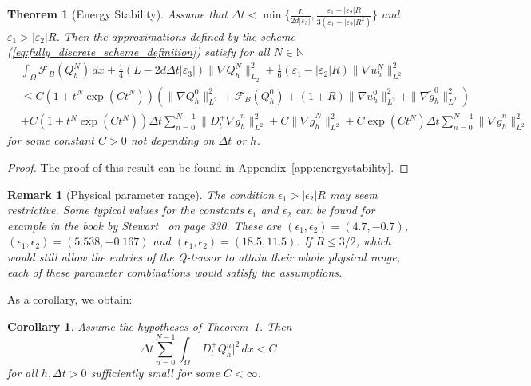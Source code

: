 \documentclass[10pt,letterpaper]{amsart}
\newtheorem{corollary}[lemma]{Corollary}
\newtheorem{theorem}[lemma]{Theorem}
\newtheorem{remark}[lemma]{Remark}
\theoremstyle{definition}{\newtheorem{definition}[lemma]{Definition}}
\theoremstyle{note}{\newtheorem{claim}{Claim}[section]
\newtheorem*{claim*}{Claim}}
\numberwithin{equation}{section}
\begin{document}
\begin{theorem}[Energy Stability]
	\label{thm:fully_discrete_energy_stability}
	Assume that $\Delta t < \min\{\frac{L}{2d|\varepsilon_3|}, \frac{\varepsilon_1 - |\varepsilon_2|R}{3(\varepsilon_1 + |\varepsilon_2|R^2)}\}$ and $\varepsilon_1 > |\varepsilon_2|R$. Then the approximations defined by the scheme (\ref{eq:fully_discrete_scheme_definition}) satisfy for all $N\in\mathbb{N}$
	\begin{align*}
	&\int_\Omega \mathcal{F}_B(Q_h^N)\, dx + \frac14\left(L - 2d\Delta t |\varepsilon_3|\right)\|\nabla Q_h^N\|_{L_2}^2 + \frac{1}{6}\left(\varepsilon_1 - |\varepsilon_2|R\right)\|\nabla u_h^N\|_{L^2}^2\\
	&\le C(1+t^N\operatorname{exp}(Ct^N))\left( \|\nabla Q_h^0\|_{L^2}^2 + \mathcal{F}_B(Q_h^0) + (1+R)\|\nabla u_h^0\|_{L^2}^2 + \|\nabla \tilde g_h^0\|_{L^2}^2\right)\\ 
	&+ C(1 + t^N\operatorname{exp}(Ct^N))\Delta t \sum_{n=0}^{N-1} \|D_t^+ \nabla\tilde g_h^n\|_{L^2}^2 + C\|\nabla\tilde g_h^N\|_{L^2}^2 + C\operatorname{exp}(Ct^N)\Delta t\sum_{n=0}^{N-1} \|\nabla \tilde g_h^n\|_{L^2}^2
	\end{align*}
	for some constant $C>0$ not depending on $\Delta t$ or $h$.
\end{theorem}
\begin{proof}
	The proof of this result can be found in Appendix~\ref{app:energystability}.
\end{proof}
\begin{remark}[Physical parameter range]
	The condition $\epsilon_1>|\epsilon_2|R$ may seem restrictive. Some typical values for the constants $\epsilon_1$ and $\epsilon_2$ can be found for example in the book by Stewart~\cite{Stewart2008} on page 330. These are $(\epsilon_1,\epsilon_2)=(4.7,-0.7)$, $(\epsilon_1,\epsilon_2)=(5.538,-0.167)$ and $(\epsilon_1,\epsilon_2)=(18.5,11.5)$. If $R\leq 3/2$, which would still allow the entries of the Q-tensor to attain their whole physical range, each of these parameter combinations would satisfy the assumptions.
\end{remark}
As a corollary, we obtain:
\begin{corollary}
	\label{corollary:fully_discrete_DtQ_L2_bound}
	Assume the hypotheses of Theorem~\ref{thm:fully_discrete_energy_stability}. Then 
	\[
	\Delta t \sum_{n=0}^{N-1}\int_\Omega \lvert D_t^+ Q_h^n\rvert^2\, dx < C
	\]
	for all $h,\Delta t >0$ sufficiently small for some $C<\infty$.
\end{corollary}
\end{document}
